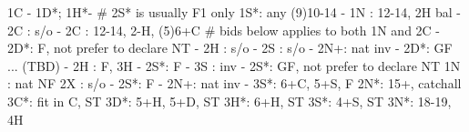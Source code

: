 1C - 1D*; 1H*-
# 2S* is usually F1 only
1S*: any (9)10-14
   - 1N : 12-14, 2H bal
        - 2C : s/o
   - 2C : 12-14, 2-H, (5)6+C
   # bids below applies to both 1N and 2C
        - 2D*: F, not prefer to declare NT
        - 2H : s/o
        - 2S : s/o
        - 2N+: nat inv
   - 2D*: GF ... (TBD)
   - 2H : F, 3H
        - 2S*: F
        - 3S : inv
   - 2S*: GF, not prefer to declare NT
1N : nat NF
2X : s/o
   - 2S*: F
   - 2N+: nat inv
   - 3S*: 6+C, 5+S, F
2N*: 15+, catchall
3C*: fit in C, ST
3D*: 5+H, 5+D, ST
3H*: 6+H, ST
3S*: 4+S, ST
3N*: 18-19, 4H
